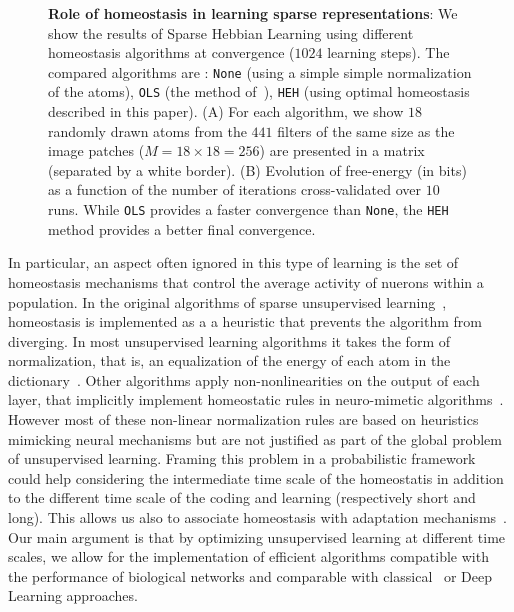 \documentclass[draft]{article} %
\begin{document}
\begin{figure}%
\caption{
{\bf Role of homeostasis in learning sparse representations}:
We show the results of Sparse Hebbian Learning using different homeostasis algorithms at convergence ($1024$ learning steps). The compared algorithms are :  \texttt{None} (using a simple simple normalization of the atoms), \texttt{OLS} (the method of~\citep{Olshausen97}), \texttt{HEH} (using optimal homeostasis described in this paper). {\sf (A)} For each algorithm, we show $18$ randomly drawn atoms from the $441$ filters of the same size as the image patches ($M= 18 \times 18=256$) are presented in a matrix (separated by a white border). %
{\sf (B)} Evolution of free-energy (in bits) as a function of the number of iterations cross-validated over $10$ runs. While \texttt{OLS} provides a faster convergence than  \texttt{None}, the \texttt{HEH}  method provides a better final convergence.%
\label{fig:map}}%
\end{figure}%
In particular, an aspect often ignored in this type of learning is the set of homeostasis mechanisms that control the average activity of nuerons within a population. %
In the original algorithms of sparse unsupervised learning~\citep{Olshausen97}, homeostasis is implemented as a a heuristic that prevents the algorithm from diverging. In most unsupervised learning algorithms it takes the form of normalization, that is, an equalization of the energy of each atom in the dictionary~\citep{Mairal14}. Other algorithms apply non-nonlinearities on the output of each layer, that implicitly implement homeostatic rules in neuro-mimetic algorithms~\citep{Brito16}. However most of these non-linear normalization rules are based on heuristics mimicking neural mechanisms but are not justified as part of the global problem of unsupervised learning.  Framing this problem in a probabilistic framework could help considering the intermediate time scale of the homeostatis in addition to the different time scale of the coding and learning (respectively short and long). This allows us also to associate homeostasis with adaptation mechanisms~\citep{Rao99}. Our main argument is that by optimizing unsupervised learning at different time scales, we allow for the implementation of efficient algorithms compatible with the performance of biological networks and comparable with classical~\citep{Olshausen97} or Deep Learning approaches.
\end{document}
